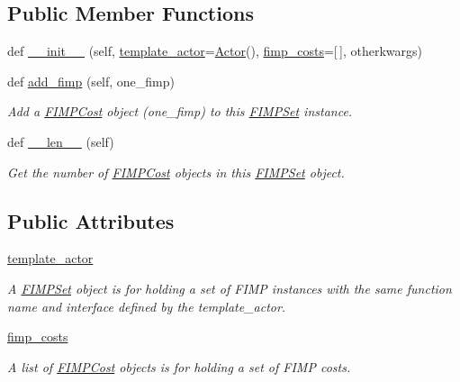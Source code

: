 \subsection*{Public Member Functions}
\begin{DoxyCompactItemize}
\item 
def \hyperlink{classsylva_1_1base_1_1fimp_1_1_f_i_m_p_set_a96a122cc6ae09985c360143cdb7eca58}{\+\_\+\+\_\+init\+\_\+\+\_\+} (self, \hyperlink{classsylva_1_1base_1_1fimp_1_1_f_i_m_p_set_add440bb6fc83efd7afa2d8fb2dfe3612}{template\+\_\+actor}=\hyperlink{classsylva_1_1base_1_1sdf_1_1_actor}{Actor}(), \hyperlink{classsylva_1_1base_1_1fimp_1_1_f_i_m_p_set_a1e7a61973ef2e8b484fdc015782774ec}{fimp\+\_\+costs}=\mbox{[}$\,$\mbox{]}, otherkwargs)
\item 
def \hyperlink{classsylva_1_1base_1_1fimp_1_1_f_i_m_p_set_afcd977effdc02e0d1818add10ab11846}{add\+\_\+fimp} (self, one\+\_\+fimp)
\begin{DoxyCompactList}\small\item\em Add a \hyperlink{classsylva_1_1base_1_1fimp_1_1_f_i_m_p_cost}{F\+I\+M\+P\+Cost} object (one\+\_\+fimp) to this \hyperlink{classsylva_1_1base_1_1fimp_1_1_f_i_m_p_set}{F\+I\+M\+P\+Set} instance. \end{DoxyCompactList}\item 
def \hyperlink{classsylva_1_1base_1_1fimp_1_1_f_i_m_p_set_a4926765210c72bc0b888b7721e6d522a}{\+\_\+\+\_\+len\+\_\+\+\_\+} (self)
\begin{DoxyCompactList}\small\item\em Get the number of \hyperlink{classsylva_1_1base_1_1fimp_1_1_f_i_m_p_cost}{F\+I\+M\+P\+Cost} objects in this \hyperlink{classsylva_1_1base_1_1fimp_1_1_f_i_m_p_set}{F\+I\+M\+P\+Set} object. \end{DoxyCompactList}\end{DoxyCompactItemize}
\subsection*{Public Attributes}
\begin{DoxyCompactItemize}
\item 
\hyperlink{classsylva_1_1base_1_1fimp_1_1_f_i_m_p_set_add440bb6fc83efd7afa2d8fb2dfe3612}{template\+\_\+actor}
\begin{DoxyCompactList}\small\item\em A \hyperlink{classsylva_1_1base_1_1fimp_1_1_f_i_m_p_set}{F\+I\+M\+P\+Set} object is for holding a set of F\+I\+MP instances with the same function name and interface defined by the template\+\_\+actor. \end{DoxyCompactList}\item 
\hyperlink{classsylva_1_1base_1_1fimp_1_1_f_i_m_p_set_a1e7a61973ef2e8b484fdc015782774ec}{fimp\+\_\+costs}
\begin{DoxyCompactList}\small\item\em A list of \hyperlink{classsylva_1_1base_1_1fimp_1_1_f_i_m_p_cost}{F\+I\+M\+P\+Cost} objects is for holding a set of F\+I\+MP costs. \end{DoxyCompactList}\end{DoxyCompactItemize}
